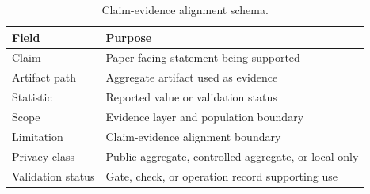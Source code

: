 \begin{table}[htbp]
\centering
\caption{Claim-evidence alignment schema.}
\label{tab:claim_schema}
\begin{tabularx}{\linewidth}{@{}lL@{}}
\toprule
Field & Purpose \\
\midrule
Claim & Paper-facing statement being supported \\
Artifact path & Aggregate artifact used as evidence \\
Statistic & Reported value or validation status \\
Scope & Evidence layer and population boundary \\
Limitation & Claim-evidence alignment boundary \\
Privacy class & Public aggregate, controlled aggregate, or local-only \\
Validation status & Gate, check, or operation record supporting use \\
\bottomrule
\end{tabularx}
\end{table}
